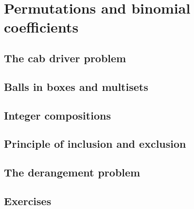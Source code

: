 \section{Permutations and binomial coefficients}\label{permutationsBinomialCoefficient} 

\subsection{The cab driver problem}

\subsection{Balls in boxes and multisets}

\subsection{Integer compositions}

\subsection{Principle of inclusion and exclusion}

\subsection{The derangement problem}

\subsection{Exercises}